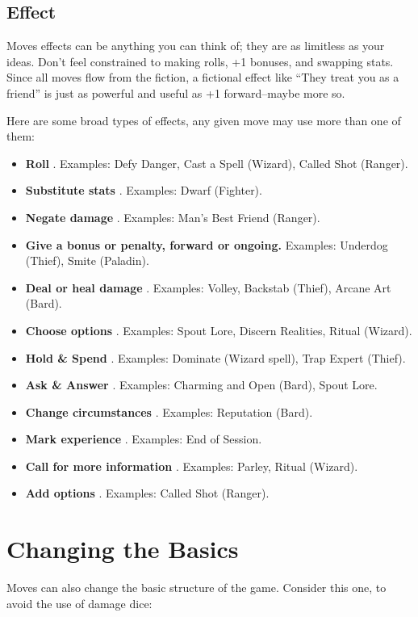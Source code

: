 \subsection{Effect}


 Moves effects can be anything you can think of; they are as limitless as your ideas. Don't feel constrained to making rolls, +1 bonuses, and swapping stats. Since all moves flow from the fiction, a fictional effect like ``They treat you as a friend'' is just as powerful and useful as +1 forward--maybe more so.


 Here are some broad types of effects, any given move may use more than one of them:
\begin{itemize}
\item \textbf{Roll}
. Examples: Defy Danger, Cast a Spell (Wizard), Called Shot (Ranger).
\item \textbf{Substitute stats}
. Examples: Dwarf (Fighter).
\item \textbf{Negate damage}
. Examples: Man's Best Friend (Ranger).
\item \textbf{Give a bonus or penalty, forward or ongoing.}
 Examples: Underdog (Thief), Smite (Paladin).
\item \textbf{Deal or heal damage}
. Examples: Volley, Backstab (Thief), Arcane Art (Bard).
\item \textbf{Choose options}
. Examples: Spout Lore, Discern Realities, Ritual (Wizard).
\item \textbf{Hold \& Spend}
. Examples: Dominate (Wizard spell), Trap Expert (Thief).
\item \textbf{Ask \& Answer}
. Examples: Charming and Open (Bard), Spout Lore.
\item \textbf{Change circumstances}
. Examples: Reputation (Bard).
\item \textbf{Mark experience}
. Examples: End of Session.
\item \textbf{Call for more information}
. Examples: Parley, Ritual (Wizard).
\item \textbf{Add options}
. Examples: Called Shot (Ranger).

\end{itemize}
\section{Changing the Basics}


 Moves can also change the basic structure of the game. Consider this one, to avoid the use of damage dice:


